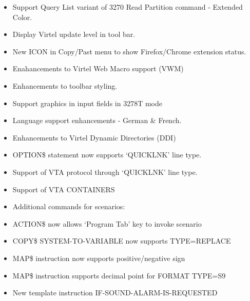 \documentclass[letterpaper,10pt,english]{sphinxmanual}
\begin{document}
\begin{itemize}
\item {} 
Support Query List variant of 3270 Read Partition command - Extended Color.

\item {} 
Display Virtel update level in tool bar.

\item {} 
New ICON in Copy/Past menu to show Firefox/Chrome extension status.

\item {} 
Enahancements to Virtel Web Macro support (VWM)

\item {} 
Enhancements to toolbar styling.

\item {} 
Support graphics in input fields in 3278T mode

\item {} 
Language support enhancements - German \& French.

\item {} 
Enhancements to Virtel Dynamic Directories (DDI)

\end{itemize}

\begin{itemize}
\item {} 
OPTION\$ statement now supports ‘QUICKLNK’ line type.

\item {} 
Support of VTA protocol through ‘QUICKLNK’ line type.

\item {} 
Support of VTA CONTAINERS

\item {} 
Additional commands for scenarios:

\item {} 
ACTION\$ now allows ‘Program Tab’ key to invoke scenario

\item {} 
COPY\$ SYSTEM-TO-VARIABLE now supports TYPE=REPLACE

\item {} 
MAP\$ instruction now supports positive/negative sign

\item {} 
MAP\$ instruction supports decimal point for FORMAT TYPE=S9

\item {} 
New template instruction IF-SOUND-ALARM-IS-REQUESTED

\end{itemize}
\end{document}
